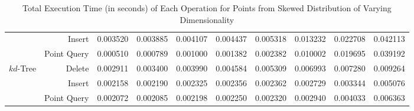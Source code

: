 \begin{landscape}
\begin{table}
{\begin{tabular}{|r|r|l|l|l|l|l|l|l|l|}
	& Insert & 0.003520 & 0.003885 & 0.004107 & 0.004437 & 0.005318 & 0.013232 & 0.022708 & 0.042113 \\ 
	& Point Query & 0.000510 & 0.000789 & 0.001000 & 0.001382 & 0.002382 & 0.010002 & 0.019695 & 0.039192 \\ 
	\hline
	\multirow{3}{*}{$kd$-Tree} & Delete & 0.002911 & 0.003400 & 0.003990 & 0.004584 & 0.005309 & 0.006993 & 0.007280 & 0.009264 \\
	& Insert & 0.002158 & 0.002190 & 0.002325 & 0.002356 & 0.002362 & 0.002729 & 0.003344 & 0.005076 \\ 
	& Point Query & 0.002072 & 0.002085 & 0.002198 & 0.002250 & 0.002320 & 0.002940 & 0.004033 & 0.006363 \\ 
	\hline

			\end{tabular}
		}%

		\caption{Total Execution Time (in seconds) of Each Operation for Points from Skewed Distribution of Varying Dimensionality}
		\label{tab:perf-synthetic-skewed-times}
	\end{table}


\end{landscape}
